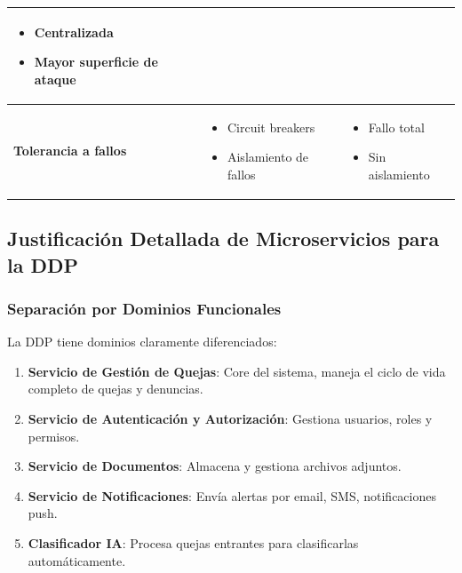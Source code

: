 \begin{table}[h]
\begin{tabular}{|p{3cm}|p{4.5cm}|p{4.5cm}|}
\begin{minipage}[t]{4.5cm}
\begin{itemize}
    \item Centralizada
    \item Mayor superficie de ataque
\end{itemize}
\end{minipage} \\
\hline
\textbf{Tolerancia a fallos} & 
\begin{minipage}[t]{4.5cm}
\begin{itemize}
    \item Circuit breakers
    \item Aislamiento de fallos
\end{itemize}
\end{minipage} & 
\begin{minipage}[t]{4.5cm}
\begin{itemize}
    \item Fallo total
    \item Sin aislamiento
\end{itemize}
\end{minipage} \\
\hline
\end{tabular}
\end{table}

\subsection{Justificación Detallada de Microservicios para la DDP}

\subsubsection{Separación por Dominios Funcionales}

La DDP tiene dominios claramente diferenciados:

\begin{enumerate}
    \item \textbf{Servicio de Gestión de Quejas}: Core del sistema, maneja el ciclo de vida completo de quejas y denuncias.
    \item \textbf{Servicio de Autenticación y Autorización}: Gestiona usuarios, roles y permisos.
    \item \textbf{Servicio de Documentos}: Almacena y gestiona archivos adjuntos.
    \item \textbf{Servicio de Notificaciones}: Envía alertas por email, SMS, notificaciones push.
    \item \textbf{Clasificador IA}: Procesa quejas entrantes para clasificarlas automáticamente.
\end{enumerate}


